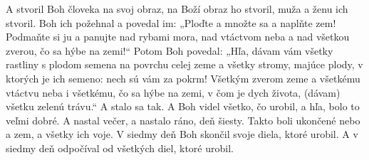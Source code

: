 A stvoril Boh človeka na svoj obraz,
na Boží obraz ho stvoril,
muža a ženu ich stvoril.
\versseparator
Boh ich požehnal a povedal im: „Ploďte a množte sa a naplňte zem! Podmaňte si ju a panujte nad rybami mora, nad vtáctvom neba a nad všetkou zverou, čo sa hýbe na zemi!“
Potom Boh povedal: „Hľa, dávam vám všetky rastliny s plodom semena na povrchu celej zeme a všetky stromy, majúce plody, v ktorých je ich semeno: nech sú vám za pokrm! Všetkým zverom zeme a všetkému vtáctvu neba i všetkému, čo sa hýbe na zemi, v čom je dych života, (dávam) všetku zelenú trávu.“ A stalo sa tak. A Boh videl všetko, čo urobil, a hľa, bolo to veľmi dobré. A nastal večer, a nastalo ráno, deň šiesty.
\versseparator
Takto boli ukončené nebo a zem, a všetky ich voje. V siedmy deň Boh skončil svoje diela, ktoré urobil. A v siedmy deň odpočíval od všetkých diel, ktoré urobil.